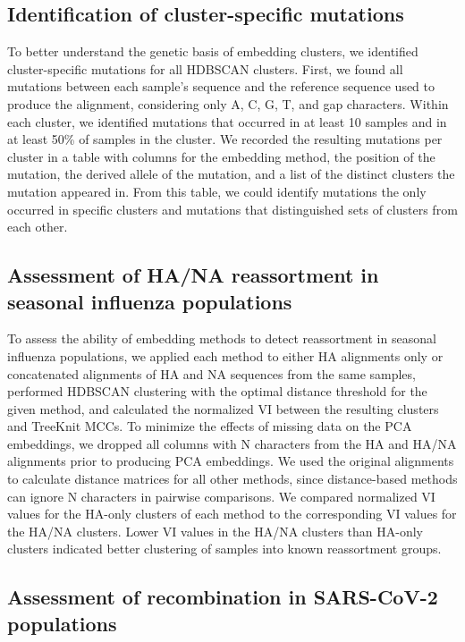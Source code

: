 \documentclass[10pt,letterpaper]{article}
\begin{document}
\subsection*{Identification of cluster-specific mutations}

To better understand the genetic basis of embedding clusters, we identified cluster-specific mutations for all HDBSCAN clusters.
First, we found all mutations between each sample's sequence and the reference sequence used to produce the alignment, considering only A, C, G, T, and gap characters.
Within each cluster, we identified mutations that occurred in at least 10 samples and in at least 50\% of samples in the cluster.
We recorded the resulting mutations per cluster in a table with columns for the embedding method, the position of the mutation, the derived allele of the mutation, and a list of the distinct clusters the mutation appeared in.
From this table, we could identify mutations the only occurred in specific clusters and mutations that distinguished sets of clusters from each other.

\subsection*{Assessment of HA/NA reassortment in seasonal influenza populations}

To assess the ability of embedding methods to detect reassortment in seasonal influenza populations, we applied each method to either HA alignments only or concatenated alignments of HA and NA sequences from the same samples, performed HDBSCAN clustering with the optimal distance threshold for the given method, and calculated the normalized VI between the resulting clusters and TreeKnit MCCs.
To minimize the effects of missing data on the PCA embeddings, we dropped all columns with N characters from the HA and HA/NA alignments prior to producing PCA embeddings.
We used the original alignments to calculate distance matrices for all other methods, since distance-based methods can ignore N characters in pairwise comparisons.
We compared normalized VI values for the HA-only clusters of each method to the corresponding VI values for the HA/NA clusters.
Lower VI values in the HA/NA clusters than HA-only clusters indicated better clustering of samples into known reassortment groups.

\subsection*{Assessment of recombination in SARS-CoV-2 populations}
\end{document}
